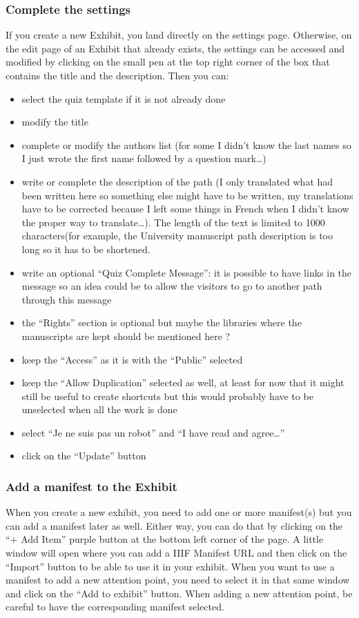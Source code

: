 	\subsubsection{Complete the settings}
    If you create a new Exhibit, you land directly on the settings page. Otherwise, on the edit page of an Exhibit that already exists, the settings can be accessed and modified by clicking on the small pen at the top right corner of the box that contains the title and the description. 
    Then you can:
    \begin{itemize}
    \item select the quiz template if it is not already done
    \item modify the title
    \item complete or modify the authors list (for some I didn’t know the last names so I just wrote the first name followed by a question mark…)
    \item write or complete the description of the path (I only translated what had been written here so something else might have to be written, my translations have to be corrected because I left some things in French when I didn't know the proper way to translate…). The length of the text is limited to 1000 characters(for example, the University manuscript path description is too long so it has to be shortened.
    \item write an optional “Quiz Complete Message”: it is possible to have links in the message so an idea could be to allow the visitors to go to another path through this message 
    \item the “Rights” section is optional but maybe the libraries where the manuscripts are kept should be mentioned here ? 
    \item keep the “Access” as it is with the “Public” selected 
    \item keep the “Allow Duplication” selected as well, at least for now that it might still be useful to create shortcuts but this would probably have to be unselected when all the work is done 
    \item select “Je ne suis pas un robot” and “I have read and agree…”
    \item click on the “Update” button
    \end{itemize}

    \subsubsection{Add a manifest to the Exhibit}
    When you create a new exhibit, you need to add one or more manifest(s) but you can add a manifest later as well. Either way, you can do that by clicking on the “+ Add Item” purple button at the bottom left corner of the page. A little window will open where you can add a IIIF Manifest URL and then click on the “Import” button to be able to use it in your exhibit. When you want to use a manifest to add a new attention point, you need to select it in that same window and click on the “Add to exhibit” button. When adding a new attention point, be careful to have the corresponding manifest selected. 

